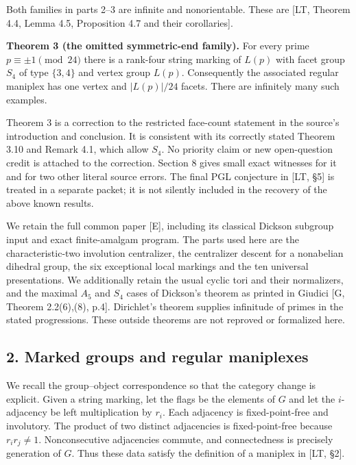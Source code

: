 \documentclass[
  11pt,
]{article}
\begin{document}
Both families in parts 2--3 are infinite and nonorientable. These are
{[}LT, Theorem 4.4, Lemma 4.5, Proposition 4.7 and their corollaries{]}.

\textbf{Theorem 3 (the omitted symmetric-end family).} For every prime
\(p\equiv\pm1\pmod{24}\) there is a rank-four string marking of \(L(p)\)
with facet group \(S_4\) of type \(\{3,4\}\) and vertex group \(L(p)\).
Consequently the associated regular maniplex has one vertex and
\(|L(p)|/24\) facets. There are infinitely many such examples.

Theorem 3 is a correction to the restricted face-count statement in the
source's introduction and conclusion. It is consistent with its
correctly stated Theorem 3.10 and Remark 4.1, which allow \(S_4\). No
priority claim or new open-question credit is attached to the
correction. Section 8 gives small exact witnesses for it and for two
other literal source errors. The final PGL conjecture in {[}LT, §5{]} is
treated in a separate packet; it is not silently included in the
recovery of the above known results.

We retain the full common paper {[}E{]}, including its classical Dickson
subgroup input and exact finite-amalgam program. The parts used here are
the characteristic-two involution centralizer, the centralizer descent
for a nonabelian dihedral group, the six exceptional local markings and
the ten universal presentations. We additionally retain the usual cyclic
tori and their normalizers, and the maximal \(A_5\) and \(S_4\) cases of
Dickson's theorem as printed in Giudici {[}G, Theorem 2.2(6),(8),
p.4{]}. Dirichlet's theorem supplies infinitude of primes in the stated
progressions. These outside theorems are not reproved or formalized
here.

\subsection{2. Marked groups and regular
maniplexes}\label{marked-groups-and-regular-maniplexes}

We recall the group--object correspondence so that the category change
is explicit. Given a string marking, let the flags be the elements of
\(G\) and let the \(i\)-adjacency be left multiplication by \(r_i\).
Each adjacency is fixed-point-free and involutory. The product of two
distinct adjacencies is fixed-point-free because \(r_i r_j\ne1\).
Nonconsecutive adjacencies commute, and connectedness is precisely
generation of \(G\). Thus these data satisfy the definition of a
maniplex in {[}LT, §2{]}.
\end{document}
